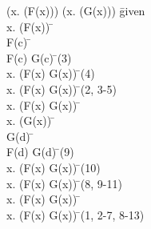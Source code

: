 \documentclass{article}
\begin{document}
\begin{proofbox}
\: (\exists x. (F(x))) \lor (\exists x. (G(x))) \= \hbox{given} \\
\openAlt
\: \exists x. (F(x)) \= \asm \\
\open
\: F(c) \= \asm \\
\: F(c) \lor G(c) \= \orintro(3) \\
\: \exists x. (F(x) \lor G(x)) \= \existsintro(4) \\
\close
\: \exists x. (F(x) \lor G(x)) \= \existselim(2, 3-5) \\
\: \exists x. (F(x) \lor G(x)) \=  \\
\splitAlt
\: \exists x. (G(x)) \= \asm \\
\open
\: G(d) \= \asm \\
\: F(d) \lor G(d) \= \orintro(9) \\
\: \exists x. (F(x) \lor G(x)) \= \existsintro(10) \\
\close
\: \exists x. (F(x) \lor G(x)) \= \existselim(8, 9-11) \\
\: \exists x. (F(x) \lor G(x)) \=  \\
\closeAlt
\: \exists x. (F(x) \lor G(x)) \= \orelim(1, 2-7, 8-13) \\
\end{proofbox}
\end{document}
